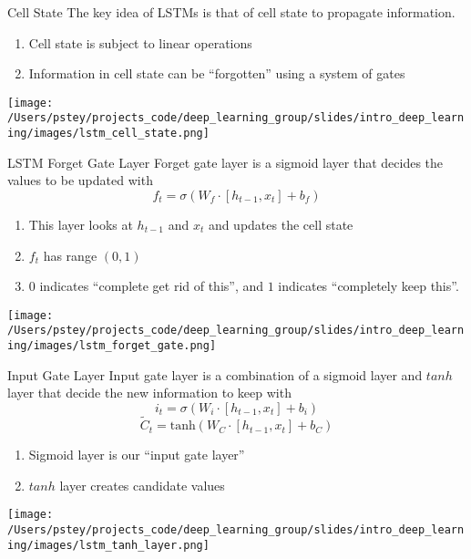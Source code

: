 \documentclass[pdf]{beamer}
\begin{document}
	\begin{frame}{Cell State}
	The key idea of LSTMs is that of cell state to propagate information.
	\vspace{2em}
	\begin{enumerate}
		\item Cell state is subject to linear operations
		\item Information in cell state can be ``forgotten'' using a system of gates
	\end{enumerate}
	\begin{center}
		\texttt{[image: /Users/pstey/projects\_code/deep\_learning\_group/slides/intro\_deep\_learning/images/lstm\_cell\_state.png]}
	\end{center}
	\end{frame}
	
	
	\begin{frame}{LSTM Forget Gate Layer}
	Forget gate layer is a sigmoid layer that decides the values to be updated with
	\[
	f_t = \sigma(W_f \cdot [h_{t-1}, x_t] + b_f)
	\]
	\begin{enumerate}
		
		\item This layer looks at $h_{t-1}$ and $x_t$ and updates the cell state
		\item $f_t$ has range $(0, 1)$
		\item $0$ indicates ``complete get rid of this'', and $1$ indicates ``completely keep this''.
	\end{enumerate}
	\begin{center}
		\texttt{[image: /Users/pstey/projects\_code/deep\_learning\_group/slides/intro\_deep\_learning/images/lstm\_forget\_gate.png]}
	\end{center}
	\end{frame}
	
	
	
	\begin{frame}{Input Gate Layer}
	Input gate layer is a combination of a sigmoid layer and $tanh$ layer that decide the new information to keep with
	\[
	i_t = \sigma(W_i \cdot [h_{t-1}, x_t] + b_i) 
	\]
	\[
	\widetilde{C}_t = \text{tanh}(W_C \cdot [h_{t-1}, x_t] + b_C)
	\]
	\begin{enumerate}
		
		\item Sigmoid layer is our ``input gate layer''
		\item $tanh$ layer creates candidate values
				
	\end{enumerate}
	\begin{center}
		\texttt{[image: /Users/pstey/projects\_code/deep\_learning\_group/slides/intro\_deep\_learning/images/lstm\_tanh\_layer.png]}
	\end{center}
	\end{frame}
	
\end{document}
